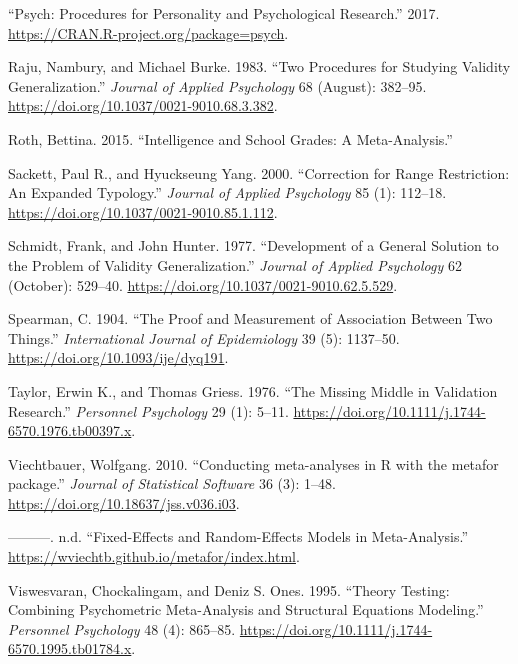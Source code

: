 \documentclass[
  letterpaper,
  DIV=11,
  numbers=noendperiod]{scrreprt}
\newlength{\cslhangindent}
\newlength{\cslentryspacingunit} %
\newenvironment{CSLReferences}[2] %
 {%
  \setlength{\parindent}{0pt}
  \ifodd #1
  \let\oldpar\par
  \def\par{\hangindent=\cslhangindent\oldpar}
  \fi
  \setlength{\parskip}{#2\cslentryspacingunit}
 }%
 {}
\begin{document}
\begin{CSLReferences}{1}{0}
\leavevmode{}%
{``Psych: Procedures for Personality and Psychological Research.''}
2017. \url{https://CRAN.R-project.org/package=psych}.

\leavevmode{}%
Raju, Nambury, and Michael Burke. 1983. {``Two Procedures for Studying
Validity Generalization.''} \emph{Journal of Applied Psychology} 68
(August): 382--95. \url{https://doi.org/10.1037/0021-9010.68.3.382}.

\leavevmode{}%
Roth, Bettina. 2015. {``Intelligence and School Grades: A
Meta-Analysis.''}

\leavevmode{}%
Sackett, Paul R., and Hyuckseung Yang. 2000. {``Correction for Range
Restriction: An Expanded Typology.''} \emph{Journal of Applied
Psychology} 85 (1): 112--18.
\url{https://doi.org/10.1037/0021-9010.85.1.112}.

\leavevmode{}%
Schmidt, Frank, and John Hunter. 1977. {``Development of a General
Solution to the Problem of Validity Generalization.''} \emph{Journal of
Applied Psychology} 62 (October): 529--40.
\url{https://doi.org/10.1037/0021-9010.62.5.529}.

\leavevmode{}%
Spearman, C. 1904. {``The Proof and Measurement of Association Between
Two Things.''} \emph{International Journal of Epidemiology} 39 (5):
1137--50. \url{https://doi.org/10.1093/ije/dyq191}.

\leavevmode{}%
Taylor, Erwin K., and Thomas Griess. 1976. {``The Missing Middle in
Validation Research.''} \emph{Personnel Psychology} 29 (1): 5--11.
\url{https://doi.org/10.1111/j.1744-6570.1976.tb00397.x}.

\leavevmode{}%
Viechtbauer, Wolfgang. 2010. {``Conducting meta-analyses in R with the
metafor package.''} \emph{Journal of Statistical Software} 36 (3):
1--48. \url{https://doi.org/10.18637/jss.v036.i03}.

\leavevmode{}%
---------. n.d. {``Fixed-Effects and Random-Effects Models in
Meta-Analysis.''} \url{https://wviechtb.github.io/metafor/index.html}.

\leavevmode{}%
Viswesvaran, Chockalingam, and Deniz S. Ones. 1995. {``Theory Testing:
Combining Psychometric Meta-Analysis and Structural Equations
Modeling.''} \emph{Personnel Psychology} 48 (4): 865--85.
\url{https://doi.org/10.1111/j.1744-6570.1995.tb01784.x}.


\end{CSLReferences}
\end{document}
